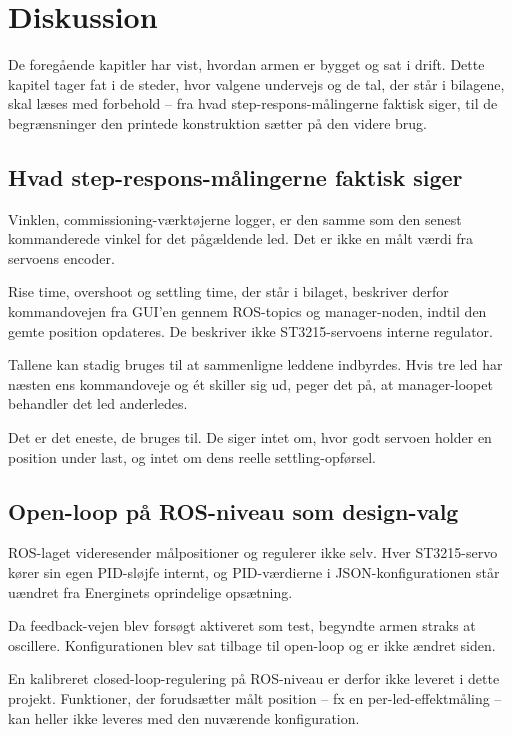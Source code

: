 \chapter{Diskussion}
\label{ch:diskussion}

De foregående kapitler har vist, hvordan armen er bygget og sat i
drift. Dette kapitel tager fat i de steder, hvor valgene undervejs
og de tal, der står i bilagene, skal læses med forbehold -- fra
hvad step-respons-målingerne faktisk siger, til de begrænsninger
den printede konstruktion sætter på den videre brug.

\section{Hvad step-respons-målingerne faktisk siger}

Vinklen, commissioning-værktøjerne logger, er den samme som den
senest kommanderede vinkel for det pågældende led. Det er ikke en
målt værdi fra servoens encoder.

Rise time, overshoot og settling time, der står i bilaget, beskriver
derfor kommandovejen fra GUI'en gennem ROS-topics og manager-noden,
indtil den gemte position opdateres. De beskriver ikke
ST3215-servoens interne regulator.

Tallene kan stadig bruges til at sammenligne leddene indbyrdes. Hvis
tre led har næsten ens kommandoveje og ét skiller sig ud, peger det
på, at manager-loopet behandler det led anderledes.

Det er det eneste, de bruges til. De siger intet om, hvor godt
servoen holder en position under last, og intet om dens reelle
settling-opførsel.

\section{Open-loop på ROS-niveau som design-valg}

ROS-laget videresender målpositioner og regulerer ikke selv. Hver
ST3215-servo kører sin egen PID-sløjfe internt, og PID-værdierne i
JSON-konfigurationen står uændret fra Energinets oprindelige
opsætning.

Da feedback-vejen blev forsøgt aktiveret som test, begyndte armen
straks at oscillere. Konfigurationen blev sat tilbage til open-loop
og er ikke ændret siden.

En kalibreret closed-loop-regulering på ROS-niveau er derfor ikke
leveret i dette projekt. Funktioner, der forudsætter målt position
-- fx en per-led-effektmåling -- kan heller ikke leveres med den
nuværende konfiguration.

